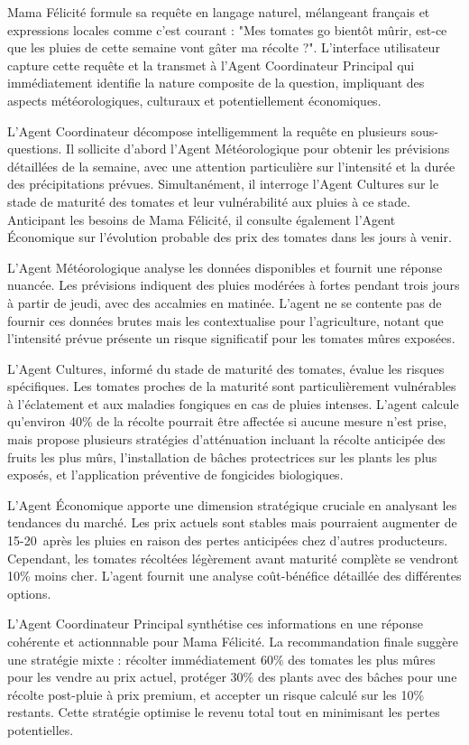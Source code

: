 Mama Félicité formule sa requête en langage naturel, mélangeant français et expressions locales comme c'est courant : "Mes tomates go bientôt mûrir, est-ce que les pluies de cette semaine vont gâter ma récolte ?". L'interface utilisateur capture cette requête et la transmet à l'Agent Coordinateur Principal qui immédiatement identifie la nature composite de la question, impliquant des aspects météorologiques, culturaux et potentiellement économiques.

L'Agent Coordinateur décompose intelligemment la requête en plusieurs sous-questions. Il sollicite d'abord l'Agent Météorologique pour obtenir les prévisions détaillées de la semaine, avec une attention particulière sur l'intensité et la durée des précipitations prévues. Simultanément, il interroge l'Agent Cultures sur le stade de maturité des tomates et leur vulnérabilité aux pluies à ce stade. Anticipant les besoins de Mama Félicité, il consulte également l'Agent Économique sur l'évolution probable des prix des tomates dans les jours à venir.

L'Agent Météorologique analyse les données disponibles et fournit une réponse nuancée. Les prévisions indiquent des pluies modérées à fortes pendant trois jours à partir de jeudi, avec des accalmies en matinée. L'agent ne se contente pas de fournir ces données brutes mais les contextualise pour l'agriculture, notant que l'intensité prévue présente un risque significatif pour les tomates mûres exposées.

L'Agent Cultures, informé du stade de maturité des tomates, évalue les risques spécifiques. Les tomates proches de la maturité sont particulièrement vulnérables à l'éclatement et aux maladies fongiques en cas de pluies intenses. L'agent calcule qu'environ 40\% de la récolte pourrait être affectée si aucune mesure n'est prise, mais propose plusieurs stratégies d'atténuation incluant la récolte anticipée des fruits les plus mûrs, l'installation de bâches protectrices sur les plants les plus exposés, et l'application préventive de fongicides biologiques.

L'Agent Économique apporte une dimension stratégique cruciale en analysant les tendances du marché. Les prix actuels sont stables mais pourraient augmenter de 15-20\ après les pluies en raison des pertes anticipées chez d'autres producteurs. Cependant, les tomates récoltées légèrement avant maturité complète se vendront 10\% moins cher. L'agent fournit une analyse coût-bénéfice détaillée des différentes options.

L'Agent Coordinateur Principal synthétise ces informations en une réponse cohérente et actionnnable pour Mama Félicité. La recommandation finale suggère une stratégie mixte : récolter immédiatement 60\% des tomates les plus mûres pour les vendre au prix actuel, protéger 30\% des plants avec des bâches pour une récolte post-pluie à prix premium, et accepter un risque calculé sur les 10\% restants. Cette stratégie optimise le revenu total tout en minimisant les pertes potentielles.

